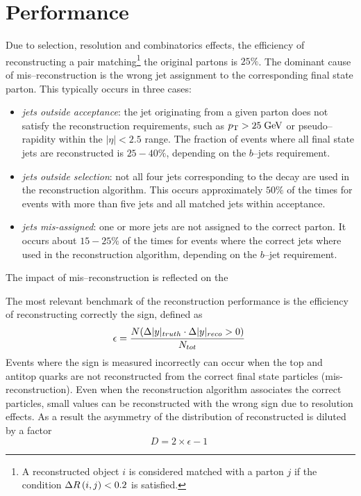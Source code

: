 \section{Performance}

Due to selection, resolution and combinatorics effects, the efficiency
of reconstructing a \ttbar{} pair matching\footnote{A reconstructed
  object $i$ is considered matched with a parton $j$ if the condition
  $\Delta{}R\left(i, j\right)<0.2$ is satisfied.} the original partons is
$25\%$. The dominant cause of mis--reconstruction is the wrong jet
assignment to the corresponding \ttbar{} final state parton. This
typically occurs in three cases:
\begin{itemize}
\item {\it jets outside acceptance}: the jet originating from a given
  parton does not satisfy the reconstruction requirements, such as
  $p_{\mathrm{T}}{}>25 \; \mathrm{GeV}$ or pseudo--rapidity within the $|\eta|<2.5$ range.
  The fraction of events where all \ttbar{} final state jets are
  reconstructed is $25-40\%$, depending on the $b$--jets requirement.
\item {\it jets outside selection}: not all four jets corresponding to
  the \ttbar{} decay are used in the reconstruction algorithm.
  This occurs approximately $50\%$ of the times for events with more
  than five jets and all matched jets within acceptance.
\item {\it jets mis-assigned}: one or more jets are not assigned to
  the correct parton. It occurs about $15-25\%$ of the times for
  events where the correct jets where used in the reconstruction
  algorithm, depending on the $b$--jet requirement.
\end{itemize}

The impact of mis--reconstruction is reflected on the 

The most relevant benchmark of the reconstruction performance is the
efficiency of reconstructing correctly the \dy{} sign, defined as
\begin{equation}
  \label{eq:dysign}
  \epsilon = \frac{N(\Delta|y|{}_{truth}\cdot\Delta|y|{}_{reco}>0)}{N_{tot}}\phantom{.}
\end{equation}
Events where the \dy{} sign is measured incorrectly can occur when the top and
antitop quarks are not reconstructed from the correct final
state particles (mis-reconstruction). Even when the reconstruction
algorithm associates the correct particles, small \dy{} values can be
reconstructed with the wrong sign due to resolution effects.
As a result the asymmetry of the distribution of reconstructed \dy{}
is diluted by a factor 
\begin{equation}
  \label{eq:dilution}
D = 2\times{}\epsilon - 1\phantom{.}
\end{equation}  

